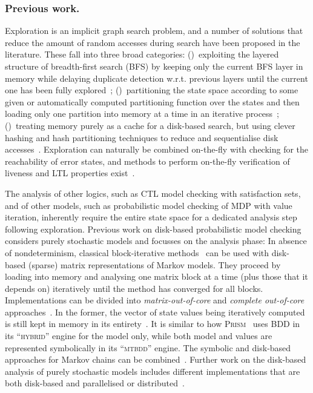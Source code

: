 \documentclass{llncs}
\newcommand{\wrt}{w.r.t.\xspace}
\newcommand{\prism}{\textsc{Prism}\xspace}
\begin{document}
\subsubsection{Previous work.}
Exploration is an implicit graph search problem, and a number of solutions that reduce the amount of random accesses during search have been proposed in the literature.
These fall into three broad categories:
()~exploiting the layered structure of breadth-first search (BFS) by keeping only the current BFS layer in memory while delaying duplicate detection \wrt previous layers until the current one has been fully explored~\cite{PITZ02,SD98};
()~partitioning the state space according to some given or automatically computed partitioning function over the states and then loading only one partition into memory at a time in an iterative process~\cite{BJ05,EK13};
()~treating memory purely as a cache for a disk-based search, but using clever hashing and hash partitioning techniques to reduce and sequentialise disk accesses~\cite{HW06}.
Exploration can naturally be combined on-the-fly with checking for the reachability of error states, and methods to perform on-the-fly verification of liveness and LTL properties exist~\cite{BBS07,EJ06,ESS08}.

The analysis of other logics, such as CTL model checking with satisfaction sets, and of other models, such as probabilistic model checking of MDP with value iteration, inherently require the entire state space for a dedicated analysis step following exploration.
Previous work on disk-based probabilistic model checking considers purely stochastic models and focusses on the analysis phase:
In absence of nondeterminism, classical block-iterative methods~\cite{Ste94} can be used  with disk-based (sparse) matrix representations of Markov models. They proceed by  loading into memory and analysing one matrix block at a time (plus those that it depends on) iteratively until the method has converged for all blocks.
Implementations can be divided into \emph{matrix-out-of-core} and \emph{complete out-of-core} approaches~\cite{Meh04}.
In the former, the vector of state values being iteratively computed is still kept in memory in its entirety~\cite{DS97}.
It is similar to how \prism~\cite{KNP11} uses BDD in its ``\textsc{hybrid}'' engine for the model only, while both model and values are represented symbolically in its ``\textsc{mtbdd}'' engine.
The symbolic and disk-based approaches for Markov chains can be combined~\cite{KMNP02}.
Further work on the disk-based analysis of purely stochastic models includes different implementations that are both disk-based and parallelised or distributed~\cite{BH06,HK99}.
\end{document}

